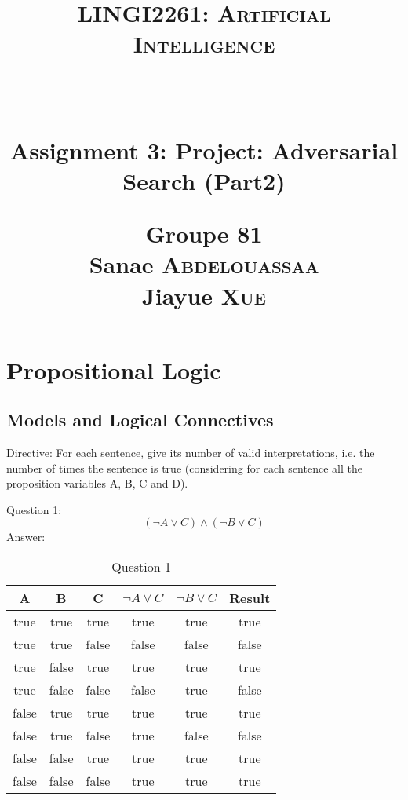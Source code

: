\documentclass[12pt, a4paper]{report}
\title{
    \vspace{0.5cm} \textcolor{db}{\textsc{LINGI2261: Artificial Intelligence}} \\
    \vspace{0.5 cm} \rule{10 cm}{0.5pt} \\
    \vspace{0.5 cm} \Large{Assignment 3: Project: Adversarial Search (Part2)} \\
    \vspace{3 cm}
    \begin{flushright}
        \large
        \textbf{Groupe 81} \\
        Sanae \textsc{Abdelouassaa} \\
        Jiayue \textsc{Xue} \\     
    \end{flushright}
    \vspace{0.5 cm}
}
\begin{document}
\maketitle

\tableofcontents
\chapter{Propositional Logic}
\section{Models and Logical Connectives}
Directive: For each sentence, give its number of valid interpretations, i.e. the number of times the sentence is true (considering for each sentence all the proposition variables A, B, C and D).

Question 1:
\begin{equation}
    (\neg A \vee C) \wedge (\neg B \vee C)
\end{equation}
Answer:
\begin{table}[h]
    \centering
    \caption{Question 1}
    \begin{tabular}{|c|c|c|c|c|c|}
    \hline
    A & B & C & $\neg A \vee C$ & $\neg B \vee C$ & Result \\
    \hline
    true & true & true & true & true & true \\
    \hline
    true & true & false & false & false & false \\
    \hline
    true & false & true & true & true & true \\
    \hline
    true & false & false & false & true & false \\
    \hline
    false & true & true & true & true & true \\
    \hline
    false & true & false & true & false & false \\
    \hline
    false & false & true & true & true & true \\
    \hline
    false & false & false & true & true & true \\
    \hline
    \end{tabular}
\end{table}
\end{document}
